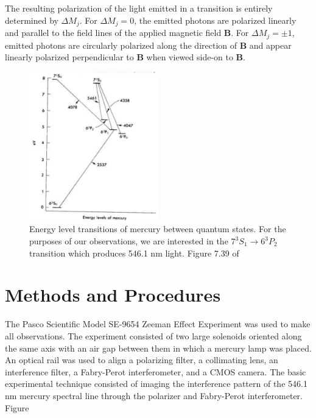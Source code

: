 \documentclass[twocolumn]{article}
\begin{document}
		The resulting polarization of the light emitted in a transition is entirely determined by $\Delta M_j$.
		For $\Delta M_j = 0$, the emitted photons are polarized linearly and parallel to the field lines of the applied magnetic field $\mathbf{B}$.
		For $\Delta M_j=\pm1$, emitted photons are circularly polarized along the direction of $\mathbf{B}$ and appear linearly polarized perpendicular to $\mathbf{B}$ when viewed side-on to $\mathbf{B}$.
		\begin{figure}
			\centering
			\includegraphics[width=0.5\textwidth]{Images/MercuryEnergyLevelsDiagram.png}
			\caption{Energy level transitions of mercury between quantum states. For the purposes of our observations, we are interested in the $7^3S_1 \rightarrow 6^3P_2$ transition which produces 546.1 nm light. Figure 7.39 of \cite{melissinos_experiments_1966}}
			\label{fig:MercuryEnergyLevelsDiagram}
		\end{figure}

		
\section{Methods and Procedures}
	The Pasco Scientific Model SE-9654 Zeeman Effect Experiment was used to make all observations.
	The experiment consisted of two large solenoids oriented along the same axis with an air gap between them in which a mercury lamp was placed.
	An optical rail was used to align a polarizing filter, a collimating lens, an interference filter, a Fabry-Perot interferometer, and a CMOS camera.
	The basic experimental technique consisted of imaging the interference pattern of the 546.1 nm mercury spectral line through the polarizer and Fabry-Perot interferometer.
	Figure 
	
\end{document}
